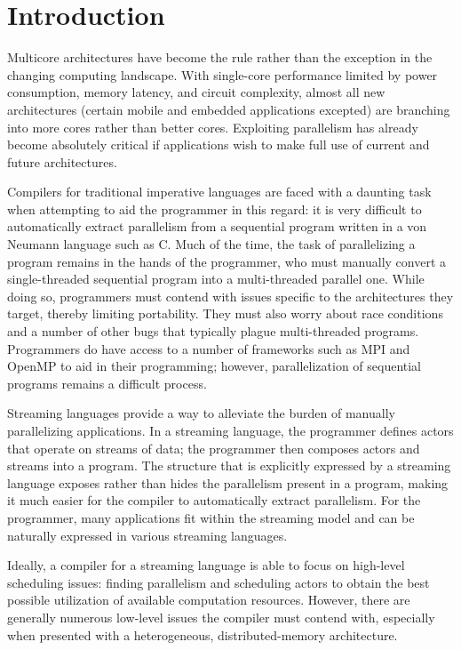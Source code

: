 \section{Introduction}

Multicore architectures have become the rule rather than the exception
in the changing computing landscape. With single-core performance
limited by power consumption, memory latency, and circuit complexity,
almost all new architectures (certain mobile and embedded applications
excepted) are branching into more cores rather than better
cores. Exploiting parallelism has already become absolutely critical
if applications wish to make full use of current and future
architectures.

Compilers for traditional imperative languages are faced with a
daunting task when attempting to aid the programmer in this regard: it
is very difficult to automatically extract parallelism from a
sequential program written in a von Neumann language such as C. Much
of the time, the task of parallelizing a program remains in the hands
of the programmer, who must manually convert a single-threaded
sequential program into a multi-threaded parallel one. While doing so,
programmers must contend with issues specific to the architectures
they target, thereby limiting portability. They must also worry about race
conditions and a number of other bugs that typically plague
multi-threaded programs. Programmers do have access to a number of
frameworks such as MPI and OpenMP to aid in their programming;
however, parallelization of sequential programs remains a difficult
process.

Streaming languages provide a way to alleviate the burden of manually
parallelizing applications. In a streaming language, the programmer
defines actors that operate on streams of data; the programmer then
composes actors and streams into a program. The structure that is
explicitly expressed by a streaming language exposes rather than hides
the parallelism present in a program, making it much easier for the
compiler to automatically extract parallelism. For the programmer,
many applications fit within the streaming model and can be naturally
expressed in various streaming languages.

Ideally, a compiler for a streaming language is able to focus on
high-level scheduling issues: finding parallelism and scheduling
actors to obtain the best possible utilization of available
computation resources. However, there are generally numerous low-level
issues the compiler must contend with, especially when presented with
a heterogeneous, distributed-memory architecture.

